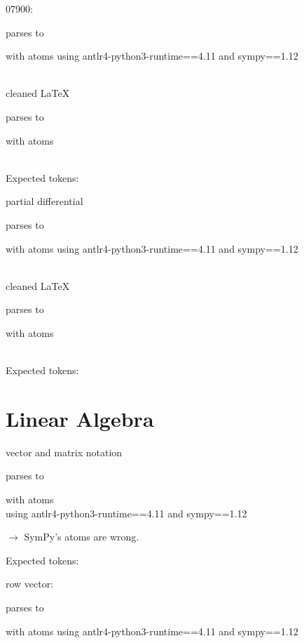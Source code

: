 \documentclass{article}
\begin{document}
\hrulefill

07900:

parses to

with atoms
using antlr4-python3-runtime==4.11 and sympy==1.12

\ \\
cleaned \LaTeX

parses to

with atoms


\ \\
Expected tokens:



\hrulefill


partial differential

parses to

with atoms
using antlr4-python3-runtime==4.11 and sympy==1.12

\ \\
cleaned \LaTeX

parses to

with atoms


\ \\
Expected tokens:



\hrulefill


\section{Linear Algebra}
vector and matrix notation
    
parses to

with atoms 
\\
using antlr4-python3-runtime==4.11 and sympy==1.12

$\rightarrow$ SymPy's atoms are wrong.

Expected tokens: 


\hrulefill



row vector:

parses to

with atoms
using antlr4-python3-runtime==4.11 and sympy==1.12
\end{document}
